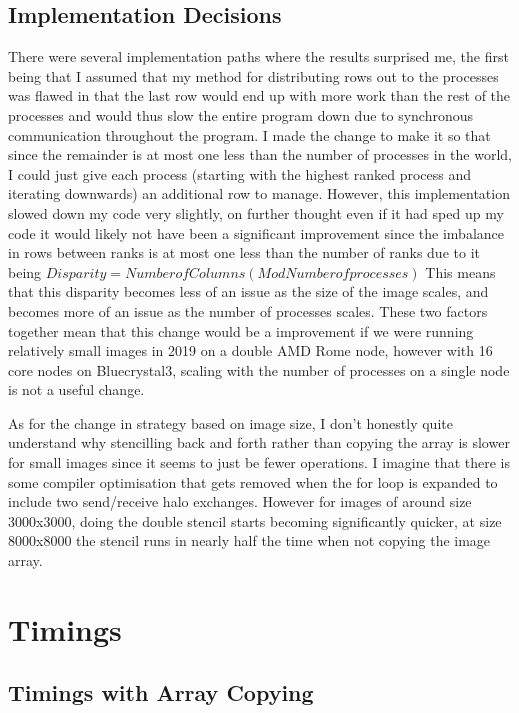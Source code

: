 \documentclass[10pt]{article}
\begin{document}
    \subsection{Implementation Decisions}
    There were several implementation paths where the results surprised me, the first being that
    I assumed that my method for distributing rows out to the processes was flawed in that the
    last row would end up with more work than the rest of the processes and would thus slow the
    entire program down due to synchronous communication throughout the program. I made the change
    to make it so that since the remainder is at most one less than the number of processes in the
    world, I could just give each process (starting with the highest ranked process and iterating downwards)
    an additional row to manage. However, this implementation slowed down my code very slightly, on further
    thought even if it had sped up my code it would likely not have been a significant improvement since the
    imbalance in rows between ranks is at most one less than the number of ranks due to it being
    $Disparity = Number of Columns (Mod Number of processes)$
    This means that this disparity becomes less of an issue as the size of the image scales, and becomes
    more of an issue as the number of processes scales. These two factors together mean that this change would
    be a improvement if we were running relatively small images in 2019 on a double AMD Rome node, however
    with 16 core nodes on Bluecrystal3, scaling with the number of processes on a single node is not a
    useful change.

    As for the change in strategy based on image size, I don't honestly quite understand why stencilling back
    and forth rather than copying the array is slower for small images since it seems to just be fewer operations.
    I imagine that there is some compiler optimisation that gets removed when the for loop is expanded to include
    two send/receive halo exchanges. However for images of around size 3000x3000, doing the double stencil starts
    becoming significantly quicker, at size 8000x8000 the stencil runs in nearly half the time when not copying the
    image array.

    \section{Timings}
    \subsection{Timings with Array Copying}
\end{document}
